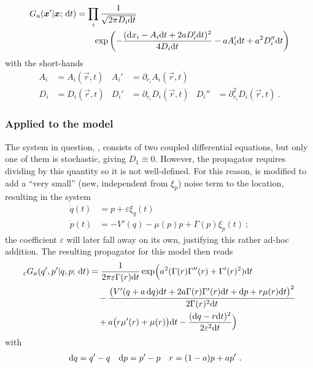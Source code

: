 %
\begin{equation}\begin{split}
	\label{eqn:propagator general}
	G_a(\boldsymbol{x}'|\boldsymbol{x};\,\mathrm{d} t)
	&= \prod_i \frac1{\sqrt{2\pi D_i\mathrm{d} t}}
	\\&\qquad
	\operatorname{exp}\left(
		- \frac{(\mathrm{d} x_i-A_i\mathrm{d} t+2aD_i'\mathrm{d} t)^2}{4D_i\mathrm{d} t}
		- a A_i'\mathrm{d} t
		+ a^2 D_i''\mathrm{d} t
		\right)
\end{split}\end{equation}
%
with the short-hands
%
\begin{align*}
	A_i &= A_i(\vec r,t)  &  A_i' &= \partial_{r_i}A_i(\vec r,t) \\
	D_i &= D_i(\vec r,t)  &  D_i' &= \partial_{r_i}D_i(\vec r,t)  &  D_i'' &= \partial_{r_i}^2D_i(\vec r,t) ~.
\end{align*}


\subsubsection{Applied to the model}

The system in question, , consists of two coupled differential equations, but only one of them is stochastic, giving \(D_1\equiv0\). However, the propagator  requires dividing by this quantity so it is not well-defined. For this reason,  is modified to add a ``very small'' (new, independent from \(\xi_p\)) noise term to the location, resulting in the system
%
\begin{equation}
	\label{eqn:underdamped sde epsilon}
	\begin{split}
		\dot q(t) &= p + \varepsilon \xi_q(t) \\
		\dot p(t) &= -V'(q) - \mu(p)p + \Gamma(p)\xi_p(t) ~;
	\end{split}
\end{equation}
%
the coefficient \(\varepsilon\) will later fall away on its own, justifying this rather ad-hoc addition.
The resulting propagator for this model then reads 
%
\begin{equation}
	\label{eqn:short time propagator}
	\begin{split}
		_\varepsilon G_a (q',p' | q,p;\,\mathrm{d} t)
		&= \frac1{2\pi\varepsilon\Gamma(r)\mathrm{d} t}
			\operatorname{exp}\Bigl(
				a^2(\Gamma(r)\Gamma''(r) + \Gamma'(r)^2)\mathrm{d} t
			\\&\quad
			-\frac{\bigl(V'(q+a\,\mathrm{d} q)\mathrm{d} t + 2 a\Gamma(r)\Gamma'(r)\mathrm{d} t + \mathrm{d} p + r\mu(r)\mathrm{d} t\bigr)^2}{2\Gamma(r)^2\mathrm{d} t}
			\\&\quad
			+ a\bigl(r\mu'(r)+\mu(r)\bigr)\mathrm{d} t
			- \frac{(\mathrm{d} q - r\mathrm{d} t)^2}{2\varepsilon^2\mathrm{d} t}
			\Bigr)
	\end{split}
\end{equation}
%
with
\begin{align*}
	\mathrm{d} q &= q' - q  &  \mathrm{d} p &= p' - p  &  r &= (1-a)p + ap' ~.
\end{align*}

